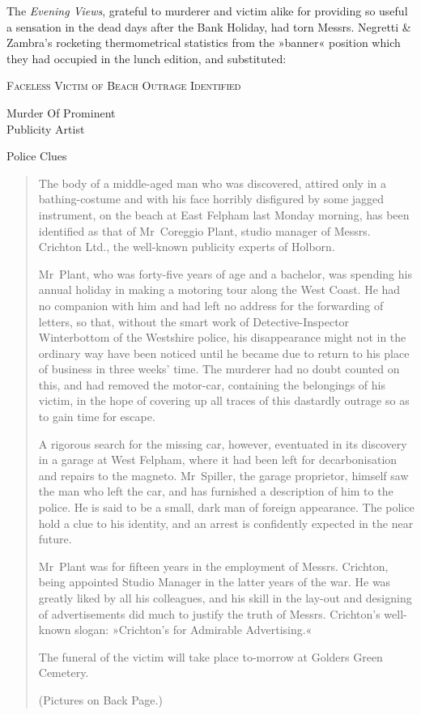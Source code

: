 The \textit{Evening Views}, grateful to murderer and victim alike for providing so useful a sensation in the dead days after the Bank Holiday, had torn Messrs. Negretti \& Zambra's rocketing thermometrical statistics from the »banner« position which they had occupied in the lunch edition, and substituted:
\begin{center}\scshape
Faceless Victim of Beach Outrage Identified

Murder Of Prominent\\
Publicity Artist\\

\pagebreak[1]

Police Clues
\end{center}

\begin{quotation}
The body of a middle-aged man who was discovered, attired only in a bathing-costume and with his face horribly disfigured by some jagged instrument, on the beach at East Felpham last Monday morning, has been identified as that of Mr~Coreggio Plant, studio manager of Messrs. Crichton Ltd., the well-known publicity experts of Holborn.

Mr~Plant, who was forty-five years of age and a bachelor, was spending his annual holiday in making a motoring tour along the West Coast. He had no companion with him and had left no address for the forwarding of letters, so that, without the smart work of Detective-Inspector Winterbottom of the Westshire police, his disappearance might not in the ordinary way have been noticed until he became due to return to his place of business in three weeks' time. The murderer had no doubt counted on this, and had removed the motor-car, containing the belongings of his victim, in the hope of covering up all traces of this dastardly outrage so as to gain time for escape.

A rigorous search for the missing car, however, eventuated in its discovery in a garage at West Felpham, where it had been left for decarbonisation and repairs to the magneto. Mr~Spiller, the garage proprietor, himself saw the man who left the car, and has furnished a description of him to the police. He is said to be a small, dark man of foreign appearance. The police hold a clue to his identity, and an arrest is confidently expected in the near future.

Mr~Plant was for fifteen years in the employment of Messrs. Crichton, being appointed Studio Manager in the latter years of the war. He was greatly liked by all his colleagues, and his skill in the lay-out and designing of advertisements did much to justify the truth of Messrs. Crichton's well-known slogan: »Crichton's for Admirable Advertising.«

The funeral of the victim will take place to-morrow at Golders Green Cemetery.

(Pictures on Back Page.)
\end{quotation}

